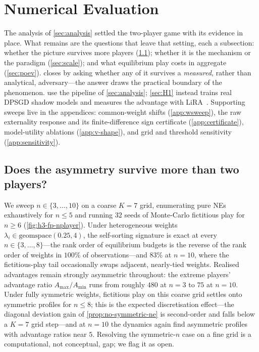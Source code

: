 \section{Numerical Evaluation}
\label{sec:experiments}

The analysis of \cref{sec:analysis} settled the two-player game
with its evidence in place. What remains are the questions that
leave that setting, each a subsection: whether the picture survives
more players (\cref{sec:H3}); whether it is the mechanism or the
paradigm (\cref{sec:scale}); and what equilibrium play costs in
aggregate (\cref{sec:poev}).  closes by asking whether
any of it survives a \emph{measured}, rather than analytical,
adversary---the answer draws the practical boundary of the
phenomenon.  use the pipeline of
\cref{sec:analysis}; \cref{sec:H1} instead trains real \ac{DPSGD}
shadow models and measures the advantage with
\ac{LiRA}~\cite{carlini2022membership}. Supporting sweeps live in
the appendices: common-weight shifts (\cref{app:wsweep}), the raw
externality response and its finite-difference sign certificate
(\cref{app:certificate}), model-utility ablations
(\cref{app:v-shape}), and grid and threshold sensitivity
(\cref{app:sensitivity}).

\subsection{Does the asymmetry survive more than two players?}
\label{sec:H3}

We sweep $n \in \{3, \dots, 10\}$ on a coarse $K = 7$ grid,
enumerating pure \acp{NE} exhaustively for $n \le 5$ and running $32$
seeds of Monte-Carlo fictitious play for $n \ge 6$
(\cref{fig:h3-fp-nplayer}). Under heterogeneous weights $\lambda_i \in
\mathrm{geomspace}(0.25, 4)$, the self-sorting signature is exact at
every $n \in \{3,\dots,8\}$---the rank order of equilibrium budgets is
the reverse of the rank order of weights in $100\%$ of
observations---and $83\%$ at $n = 10$, where the fictitious-play tail
occasionally swaps adjacent, nearly-tied weights. Realised advantages
remain strongly asymmetric throughout: the extreme players' advantage
ratio $A_{\max}/A_{\min}$ runs from roughly $480$ at $n = 3$ to $75$
at $n = 10$. Under fully symmetric weights, fictitious play on this coarse
grid settles onto symmetric profiles for $n \le 8$; this is the
expected discretisation effect---the diagonal deviation gain of
\cref{prop:no-symmetric-ne} is second-order and falls below a $K = 7$
grid step---and at $n = 10$ the dynamics again find asymmetric
profiles with advantage ratios near $5$. Resolving the symmetric-$n$
case on a fine grid is a computational, not conceptual, gap; we flag
it as open.

